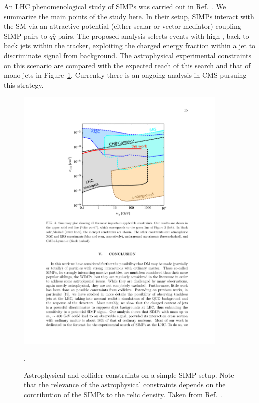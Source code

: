 An LHC phenomenological study of SIMPs was carried out in Ref.~\cite{Daci:2015hca}. We summarize the main points of the study here. In their setup, SIMPs interact with the SM via an attractive potential (either scalar or vector mediator) coupling SIMP pairs to $q\bar{q}$ pairs. The proposed analysis selects events with high-\pT, back-to-back jets within the tracker, exploiting the charged energy fraction within a jet to discriminate signal from background. The astrophysical experimental constraints on this scenario are compared with the expected reach of this search and that of mono-jets in Figure~\ref{fig:simps}. Currently there is an ongoing analysis in CMS pursuing this strategy.

\begin{figure}[t]
\centering
\includegraphics[width=0.9\textwidth]{plots/simps_constraints.pdf}
\caption{Astrophysical and collider constraints on a simple SIMP setup. Note that the relevance of the astrophysical constraints depends on the contribution of the SIMPs to the relic density. Taken from Ref.~\cite{Daci:2015hca}.}
  \label{fig:simps}.
\end{figure}

